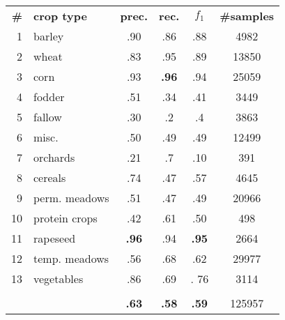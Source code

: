 \begin{tabular}{rlcccc}
\toprule
\textbf{\#} & \textbf{crop type} &  \textbf{prec.} & \textbf{rec.} & \textbf{$f_1$} & \textbf{\#samples} \\
\cmidrule(lr){1-1}\cmidrule(lr){2-2}\cmidrule(lr){3-3}\cmidrule(lr){4-4}\cmidrule(lr){5-5}\cmidrule(lr){6-6}
1 & barley &         .90 &          .86 &          .88 &     4982 \\
2 & wheat &         .83 &          .95 &          .89 &    13850 \\
3 & corn &         .93 &          \textbf{.96} &          .94 &    25059 \\
4 & fodder &         .51 &          .34 &          .41 &     3449 \\
5 & fallow &         .30 &           .2 &           .4 &     3863 \\
6 & misc. &         .50 &          .49 &          .49 &    12499 \\
7 & orchards &         .21 &           .7 &          .10 &      391 \\
8 & cereals &         .74 &          .47 &          .57 &     4645 \\
9 & perm. meadows &         .51 &          .47 &          .49 &    20966 \\
10 & protein crops &         .42 &          .61 &          .50 &      498 \\
11 & rapeseed &         \textbf{.96} &          .94 &          \textbf{.95} &     2664 \\
12 & temp. meadows &         .56 &          .68 &          .62 &    29977 \\
13 & vegetables &         .86 &          .69 &         . 76 &     3114 \\
   &                       &            &             &             &          \\
   &                       &         \textbf{.63} &          \textbf{.58} &          \textbf{.59} &   125957 \\
\bottomrule
\end{tabular}

